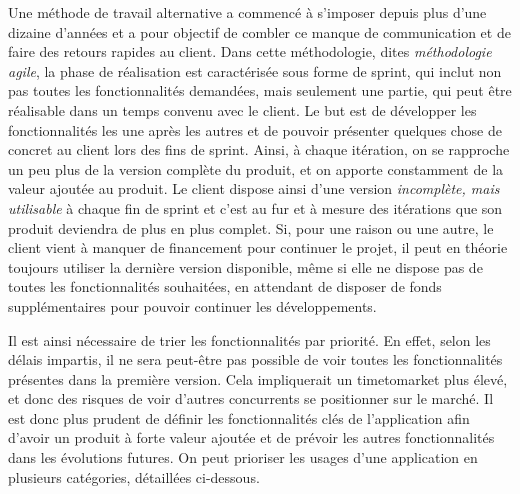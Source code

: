 Une méthode de travail alternative a commencé à s'imposer depuis plus d'une dizaine d'années et a pour objectif de combler ce manque de communication et de faire des retours rapides au client. Dans cette méthodologie, dites \emph{méthodologie agile}, la phase de réalisation est caractérisée sous forme de sprint, qui inclut non pas toutes les fonctionnalités demandées, mais seulement une partie, qui peut être réalisable dans un temps convenu avec le client. Le but est de développer les fonctionnalités les une après les autres et de pouvoir présenter quelques chose de concret au client lors des fins de sprint. Ainsi, à chaque itération, on se rapproche un peu plus de la version complète du produit, et on apporte constamment de la valeur ajoutée au produit. Le client dispose ainsi d'une version \emph{incomplète, mais utilisable} à chaque fin de sprint et c'est au fur et à mesure des itérations que son produit deviendra de plus en plus complet. Si, pour une raison ou une autre, le client vient à manquer de financement pour continuer le projet, il peut en théorie toujours utiliser la dernière version disponible, même si elle ne dispose pas de toutes les fonctionnalités souhaitées, en attendant de disposer de fonds supplémentaires pour pouvoir continuer les développements.


Il est ainsi nécessaire de trier les fonctionnalités par priorité. En effet, selon les délais impartis, il ne sera peut-être pas possible de voir toutes les fonctionnalités présentes dans la première version. Cela impliquerait un \gls{timetomarket} plus élevé, et donc des risques de voir d'autres concurrents se positionner sur le marché. Il est donc plus prudent de définir les fonctionnalités clés de l'application afin d'avoir un produit à forte valeur ajoutée et de prévoir les autres fonctionnalités dans les évolutions futures. On peut prioriser les usages d'une application en plusieurs catégories, détaillées ci-dessous.

